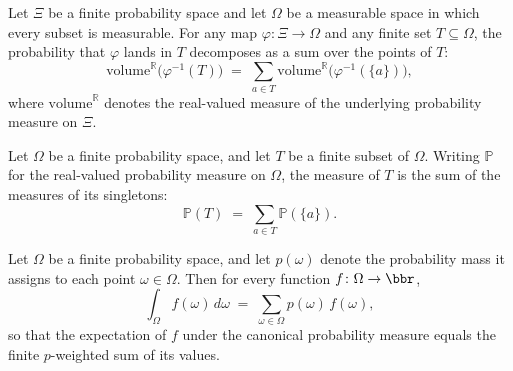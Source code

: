 \begin{theorem}
\label{CommunicationComplexity.FiniteProbabilitySpace.measureReal_preimage_finset}
\leanok
{}
Let $\Xi$ be a finite probability space and let $\Omega$ be a measurable space in which
every subset is measurable. For any map $\varphi \colon \Xi \to \Omega$ and any finite
set $T \subseteq \Omega$, the probability that $\varphi$ lands in $T$ decomposes as a
sum over the points of $T$:
\[
  \mathrm{volume}^{\mathbb{R}}\bigl(\varphi^{-1}(T)\bigr)
  \;=\; \sum_{a \in T} \mathrm{volume}^{\mathbb{R}}\bigl(\varphi^{-1}(\{a\})\bigr),
\]
where $\mathrm{volume}^{\mathbb{R}}$ denotes the real-valued measure of the underlying
probability measure on $\Xi$.
\end{theorem}

\begin{theorem}
\label{CommunicationComplexity.FiniteProbabilitySpace.measureReal_finset}
\leanok
{}
Let $\Omega$ be a finite probability space, and let $T$ be a finite subset of $\Omega$.
Writing $\mathbb{P}$ for the real-valued probability measure on $\Omega$, the measure of
$T$ is the sum of the measures of its singletons:
\[
  \mathbb{P}(T) \;=\; \sum_{a \in T} \mathbb{P}(\{a\}).
\]
\end{theorem}

\begin{theorem}
\label{CommunicationComplexity.FiniteProbabilitySpace.integral_eq_pmf_sum}
\leanok
{}
Let $\Omega$ be a finite probability space, and let $p(\omega)$ denote the probability
mass it assigns to each point $\omega \in \Omega$. Then for every function $f \colon
\Omega \to \bbr$,
\[
  \int_\Omega f(\omega)\,d\omega \;=\; \sum_{\omega \in \Omega} p(\omega)\, f(\omega),
\]
so that the expectation of $f$ under the canonical probability measure equals the finite
$p$-weighted sum of its values.
\end{theorem}

